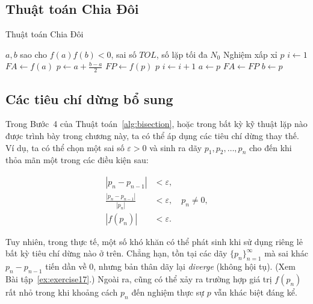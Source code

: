 \subsection{Thuật toán Chia Đôi}
\label{subsec:bisection_algorithm}

\begin{algorithm}
\caption{Thuật toán Chia Đôi}
\label{alg:bisection}
\begin{algorithmic}[1]
\Require $a,b$ sao cho $f(a)f(b) < 0$, sai số $TOL$, số lặp tối đa $N_0$
\Ensure Nghiệm xấp xỉ $p$
\State $i \gets 1$
\State $FA \gets f(a)$
    \State $p \gets a + \frac{b-a}{2}$
    \State $FP \gets f(p)$
        \Return $p$
    \EndIf
    \State $i \gets i+1$
        \State $a \gets p$
        \State $FA \gets FP$
    \Else
        \State $b \gets p$
    \EndIf
\EndWhile
{}
\end{algorithmic}
\end{algorithm}

\subsection*{Các tiêu chí dừng bổ sung}
\label{subsec:additional_stopping}

Trong Bước~4 của Thuật toán~\ref{alg:bisection}, hoặc trong bất kỳ kỹ thuật lặp nào
được trình bày trong chương này, ta có thể áp dụng các tiêu chí dừng thay thế.
Ví dụ, ta có thể chọn một sai số $\varepsilon > 0$ và sinh ra dãy
$p_1, p_2, \dots, p_n$ cho đến khi thỏa mãn một trong các điều kiện sau:

\begin{align}
|p_n - p_{n-1}| &< \varepsilon, \label{eq:stop_a}\\[6pt]
\frac{|p_n - p_{n-1}|}{|p_n|} &< \varepsilon, \quad p_n \neq 0, \label{eq:stop_b}\\[6pt]
|f(p_n)| &< \varepsilon. \label{eq:stop_c}
\end{align}

Tuy nhiên, trong thực tế, một số khó khăn có thể phát sinh khi sử dụng riêng lẻ
bất kỳ tiêu chí dừng nào ở trên. Chẳng hạn, tồn tại các dãy $\{p_n\}_{n=1}^{\infty}$
mà sai khác $p_n - p_{n-1}$ tiến dần về 0, nhưng bản thân dãy lại \emph{diverge}
(không hội tụ). (Xem Bài tập~\ref{ex:exercise17}.) Ngoài ra, cũng có thể xảy ra trường hợp
giá trị $f(p_n)$ rất nhỏ trong khi khoảng cách $p_n$ đến nghiệm thực sự $p$ vẫn khác biệt đáng kể.

